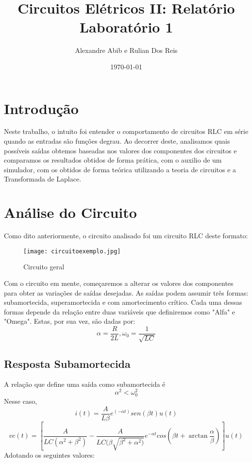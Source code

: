 \documentclass[12pt]{article}
\title{Circuitos Elétricos II: Relatório Laboratório 1}
\author{Alexandre Abib e Rulian Dos Reis}
\date{\today}
\begin{document}
	\maketitle
	\section{Introdução}
	Neste trabalho, o intuito foi entender o comportamento de circuitos RLC em série quando as entradas são funções degrau. Ao decorrer deste, analisamos quais possíveis saídas obtemos baseadas nos valores dos componentes dos circuitos e comparamos os resultados obtidos de forma prática, com o auxilio de um simulador, com os obtidos de forma teórica utilizando a teoria de circuitos e a Transformada de Laplace.
	\section{Análise do Circuito}
	Como dito anteriormente, o circuito analisado foi um circuito RLC deste formato:
	\begin{figure}[!h]
		\centering
		\texttt{[image: circuitoexemplo.jpg]}
		\caption{Circuito geral}
	\end{figure}
	
	Com o circuito em mente, começaremos a alterar os valores dos componentes para obter as variações de saídas desejadas. As saídas podem assumir três formas: subamortecida, superamortecida e com amortecimento crítico. Cada uma dessas formas depende da relação entre duas variáveis que definiremos como "Alfa" e "Omega". Estas, por sua vez, são dadas por:
	\begin{equation}
		\alpha = \frac{R}{2L} , \omega_0 = \frac{1}{\sqrt{LC}}  
	\end{equation}


	\subsection{Resposta Subamortecida}
	A relação que define uma saída como subamortecida é 
	\begin{equation}
		\alpha^2 < \omega_0 ^2
	\end{equation}
	Nesse caso, 
	\begin{equation}
		i(t) = \frac{A}{L\beta}e^{(-\alpha t)}sen(\beta t)u(t)
	\end{equation}
	\begin{equation}
		vc(t) = [\frac{A}{LC(\alpha^2+\beta^2)} - \frac{A}{LC(\beta \sqrt{\beta^2 + \alpha^2)}}e^{-\alpha t}cos(\beta t + \arctan{\frac{\alpha}{\beta}})]u(t)
	\end{equation}
	Adotando os seguintes valores: 
	
\end{document}
